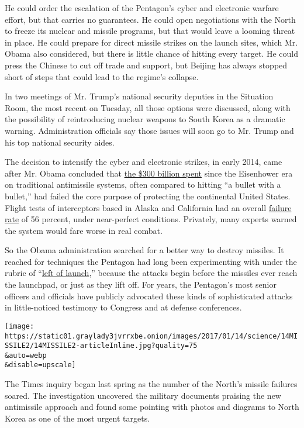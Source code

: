 He could order the escalation of the Pentagon's cyber and electronic
warfare effort, but that carries no guarantees. He could open
negotiations with the North to freeze its nuclear and missile programs,
but that would leave a looming threat in place. He could prepare for
direct missile strikes on the launch sites, which Mr. Obama also
considered, but there is little chance of hitting every target. He could
press the Chinese to cut off trade and support, but Beijing has always
stopped short of steps that could lead to the regime's collapse.

In two meetings of Mr. Trump's national security deputies in the
Situation Room, the most recent on Tuesday, all those options were
discussed, along with the possibility of reintroducing nuclear weapons
to South Korea as a dramatic warning. Administration officials say those
issues will soon go to Mr. Trump and his top national security aides.

The decision to intensify the cyber and electronic strikes, in early
2014, came after Mr. Obama concluded that
\href{http://wmdjunction.com/120413_missile_defense_costs.htm}{the \$300
billion spent} since the Eisenhower era on traditional antimissile
systems, often compared to hitting ``a bullet with a bullet,'' had
failed the core purpose of protecting the continental United States.
Flight tests of interceptors based in Alaska and California had an
overall
\href{https://www.mda.mil/global/documents/pdf/testrecord.pdf}{failure
rate} of 56 percent, under near-perfect conditions. Privately, many
experts warned the system would fare worse in real combat.

So the Obama administration searched for a better way to destroy
missiles. It reached for techniques the Pentagon had long been
experimenting with under the rubric of
``\href{http://missiledefenseadvocacy.org/alert/3132/}{left of
launch},'' because the attacks begin before the missiles ever reach the
launchpad, or just as they lift off. For years, the Pentagon's most
senior officers and officials have publicly advocated these kinds of
sophisticated attacks in little-noticed testimony to Congress and at
defense conferences.

\texttt{[image: https://static01.graylady3jvrrxbe.onion/images/2017/01/14/science/14MISSILE2/14MISSILE2-articleInline.jpg?quality=75\\\&auto=webp\\\&disable=upscale]}

The Times inquiry began last spring as the number of the North's missile
failures soared. The investigation uncovered the military documents
praising the new antimissile approach and found some pointing with
photos and diagrams to North Korea as one of the most urgent targets.

